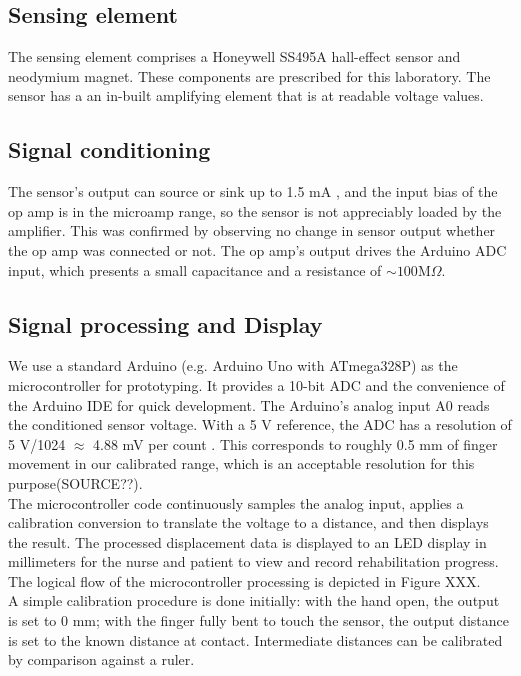 \documentclass[a4paper,12pt]{article}
\begin{document}
\subsection{Sensing element}
The sensing element comprises a Honeywell SS495A hall-effect sensor \cite{ti_datasheet} and neodymium magnet. These components are prescribed for this laboratory. The sensor has a an in-built amplifying element that is at readable voltage values.

\subsection{Signal conditioning}
The sensor’s output can source or sink up to 1.5 mA  \cite{ti_datasheet}, and the input bias of the op amp is in the microamp range, so the sensor is not appreciably loaded by the amplifier. This was confirmed by observing no change in sensor output whether the op amp was connected or not. The op amp’s output drives the Arduino ADC input, which presents a small capacitance and a resistance of $\sim 100 \text{M} \Omega$.

\subsection{Signal processing and Display}
We use a standard Arduino (e.g. Arduino Uno with ATmega328P) as the microcontroller for prototyping. It provides a 10-bit ADC and the convenience of the Arduino IDE for quick development. The Arduino’s analog input A0 reads the conditioned sensor voltage. With a 5 V reference, the ADC has a resolution of 5 V/1024 $\approx$ 4.88 mV per count \cite{hu2025adc}. This corresponds to roughly 0.5 mm of finger movement in our calibrated range, which is an acceptable resolution for this purpose(SOURCE??).\\ 
The microcontroller code continuously samples the analog input, applies a calibration conversion to translate the voltage to a distance, and then displays the result. The processed displacement data is displayed to an LED display in millimeters for the nurse and patient to view and record rehabilitation progress. The logical flow of the microcontroller processing is depicted in Figure XXX.\\
A simple calibration procedure is done initially: with the hand open, the output is set to 0 mm; with the finger fully bent to touch the sensor, the output distance is set to the known distance at contact. Intermediate distances can be calibrated by comparison against a ruler. 
\end{document}
